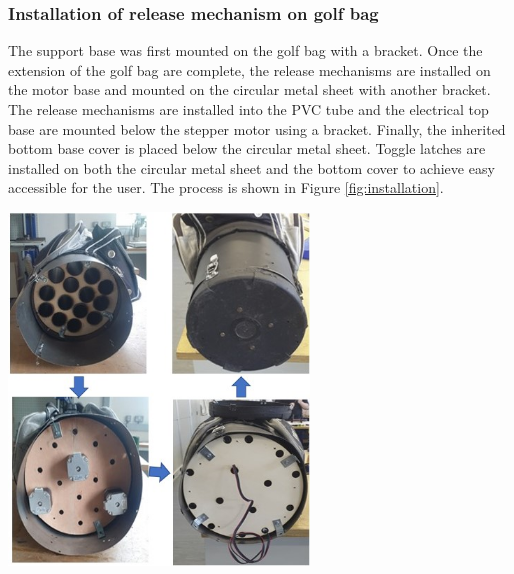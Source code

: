 \documentclass[11pt,landscape]{article}
\newenvironment{Figure}
  {\par\medskip\noindent\minipage{\linewidth}}
  {\endminipage\par\medskip}
\begin{document}
\begin{multicols}{3}
    \subsubsection{Installation of release mechanism on golf bag }
    The support base was first mounted on the golf bag with a bracket. Once the
    extension of the golf bag are complete, the release mechanisms are installed
    on the motor base and mounted on the circular metal sheet with another
    bracket. The release mechanisms are installed into the PVC tube and the
    electrical top base are mounted below the stepper motor using a bracket.
    Finally, the inherited bottom base cover is placed below the circular
    metal sheet. Toggle latches are installed on both the circular metal sheet
    and the bottom cover to achieve easy accessible for the user. The process is
    shown in Figure \ref{fig:installation}.
    \begin{Figure}
        \begin{center}
            \includegraphics[width=0.6\textwidth]{Figure30.jpg}
            \label{fig:installation}
        \end{center}
    \end{Figure}
\end{multicols}
\end{document}
